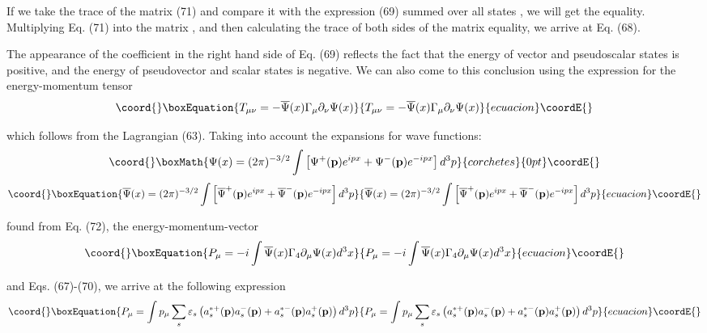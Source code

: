 \documentclass[a4paper,12pt]{article}
\begin{document}
If we take the trace of the matrix (71) and compare it with the expression
(69) summed over all states \coordHE{}, we will get the equality. Multiplying Eq.
(71) into the matrix \coordHE{}, and then calculating the trace of both
sides of the matrix equality, we arrive at Eq. (68).

The appearance of the coefficient \coordHE{} in the right hand
side of Eq. (69) reflects the fact that the energy of vector and
pseudoscalar states is positive, and the energy of pseudovector and scalar
states is negative. We can also come to this conclusion using the expression
for the energy-momentum tensor
\begin{equation}\coord{}\boxEquation{
T_{\mu \nu }=-\overline{\Psi }(x)\Gamma _\mu \partial _\nu \Psi (x)
\label{72}
}{
T_{\mu \nu }=-\overline{\Psi }(x)\Gamma _\mu \partial _\nu \Psi (x)
}{ecuacion}\coordE{}\end{equation}

which follows from the Lagrangian (63). Taking into account the expansions
for wave functions:
\[\coord{}\boxMath{
\Psi (x)=(2\pi )^{-3/2}\int \left[ \Psi
^{+}(\mathbf{p})e^{ipx}+\Psi ^{-}( \mathbf{p})e^{-ipx}\right] d^3p
}{corchetes}{0pt}\coordE{}\]
\begin{equation}\coord{}\boxEquation{
\overline{\Psi }(x)=(2\pi )^{-3/2}\int \left[ \overline{\Psi
}^{+}(\mathbf{p} )e^{ipx}+\overline{\Psi
}^{-}(\mathbf{p})e^{-ipx}\right] d^3p  \label{73}
}{
\overline{\Psi }(x)=(2\pi )^{-3/2}\int \left[ \overline{\Psi
}^{+}(\mathbf{p} )e^{ipx}+\overline{\Psi
}^{-}(\mathbf{p})e^{-ipx}\right] d^3p  }{ecuacion}\coordE{}\end{equation}

found from Eq. (72), the energy-momentum-vector
\begin{equation}\coord{}\boxEquation{
P_\mu =-i\int \overline{\Psi }(x)\Gamma _4\partial _\mu \Psi (x)d^3x
\label{74}
}{
P_\mu =-i\int \overline{\Psi }(x)\Gamma _4\partial _\mu \Psi (x)d^3x
}{ecuacion}\coordE{}\end{equation}

and Eqs. (67)-(70), we arrive at the following expression
\begin{equation}\coord{}\boxEquation{
P_\mu =\int p_\mu \sum_s\varepsilon _s\left(
a_s^{*+}(\mathbf{p})a_s^{-}(
\mathbf{p})+a_s^{*-}(\mathbf{p})a_s^{+}(\mathbf{p})\right) d^3p
\label{75}
}{
P_\mu =\int p_\mu \sum_s\varepsilon _s\left(
a_s^{*+}(\mathbf{p})a_s^{-}(
\mathbf{p})+a_s^{*-}(\mathbf{p})a_s^{+}(\mathbf{p})\right) d^3p
}{ecuacion}\coordE{}\end{equation}
\end{document}
